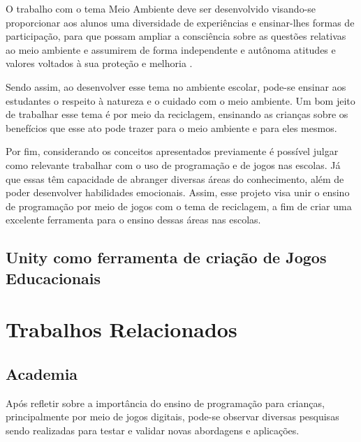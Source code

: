 \begin{citacao}

O trabalho com o tema Meio Ambiente deve ser desenvolvido visando-se proporcionar aos alunos uma diversidade de experiências e ensinar-lhes formas de participação, para que possam ampliar a consciência sobre as questões relativas ao meio ambiente e assumirem de forma independente e autônoma atitudes e valores voltados à sua proteção e melhoria \cite[p. 46]{pcns_2001}.

\end{citacao}


Sendo assim, ao desenvolver esse tema no ambiente escolar, pode-se ensinar aos estudantes o respeito à natureza e o cuidado com o meio ambiente. Um bom jeito de trabalhar esse tema é por meio da reciclagem, ensinando as crianças sobre os benefícios que esse ato pode trazer para o meio ambiente e para eles mesmos.

Por fim, considerando os conceitos apresentados previamente é possível julgar como relevante trabalhar com o uso de programação e de jogos nas escolas. Já que essas têm capacidade de abranger diversas áreas do conhecimento, além de poder desenvolver habilidades emocionais. Assim, esse projeto visa unir o ensino de programação por meio de jogos com o tema de reciclagem, a fim de criar uma excelente ferramenta para o ensino dessas áreas nas escolas.

\subsection{Unity como ferramenta de criação de Jogos Educacionais}



\section{Trabalhos Relacionados}

\subsection{Academia}
Após refletir sobre a importância do ensino de programação para crianças, principalmente por meio de jogos digitais, pode-se observar diversas pesquisas sendo realizadas para testar e validar novas abordagens e aplicações. 


